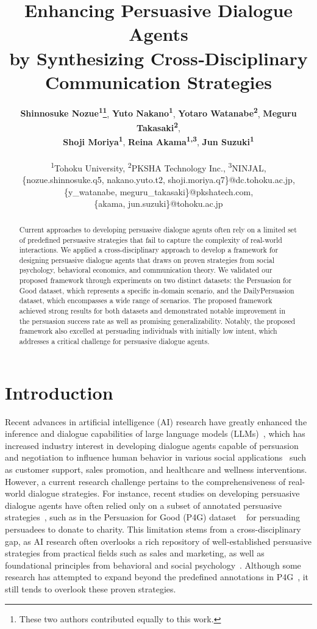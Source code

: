 \documentclass[11pt]{article}
\title{Enhancing Persuasive Dialogue Agents \\ by Synthesizing Cross‑Disciplinary Communication Strategies}
\author{ 
    \textbf{Shinnosuke Nozue\textsuperscript{1}\thanks{These two authors contributed equally to this work.}},
    \textbf{Yuto Nakano\textsuperscript{1}\footnotemark[1]},
    \textbf{Yotaro Watanabe\textsuperscript{2}},
    \textbf{Meguru Takasaki\textsuperscript{2}},
    \\
    \textbf{Shoji Moriya\textsuperscript{1}},
    \textbf{Reina Akama\textsuperscript{1,3}},
    \textbf{Jun Suzuki\textsuperscript{1}}
    \\
    \\
    \textsuperscript{1}Tohoku University,
    \textsuperscript{2}PKSHA Technology Inc.,
    \textsuperscript{3}NINJAL,
    \\
    \{nozue.shinnosuke.q5, nakano.yuto.t2, shoji.moriya.q7\}@dc.tohoku.ac.jp,\\
    \{y\_watanabe, meguru\_takasaki\}@pkshatech.com,\\
    \{akama, jun.suzuki\}@tohoku.ac.jp
}
\begin{document}
\maketitle

\begin{abstract}
Current approaches to developing persuasive dialogue agents often rely on a limited set of predefined persuasive strategies that fail to capture the complexity of real-world interactions. 
We applied a cross-disciplinary approach to develop a framework for designing persuasive dialogue agents that draws on proven strategies from social psychology, behavioral economics, and communication theory. 
We validated our proposed framework through experiments on two distinct datasets: the Persuasion for Good dataset, which represents a specific in-domain scenario, and the DailyPersuasion dataset, which encompasses a wide range of scenarios. 
The proposed framework achieved strong results for both datasets and demonstrated notable improvement in the persuasion success rate as well as promising generalizability. 
Notably, the proposed framework also excelled at persuading individuals with initially low intent, which addresses a critical challenge for persuasive dialogue agents.

\end{abstract}

\section{Introduction}
Recent advances in artificial intelligence (AI) research have greatly enhanced the inference and dialogue capabilities of large language models (LLMs)~\citep{brown2020language,openai2023gpt4}, which has increased industry interest in developing dialogue agents capable of persuasion and negotiation to influence human behavior in various social applications~\citep{deng2024towards,deng2025proactive, zhang-etal-2024-strength, zhan-etal-2024-lets, jin-etal-2024-persuading} such as customer support, sales promotion, and healthcare and wellness interventions. 
However, a current research challenge pertains to the comprehensiveness of real-world dialogue strategies.
For instance, recent studies on developing persuasive dialogue agents have often relied only on a subset of annotated persuasive strategies~\citep{song-wang-2024-like, cheng2024cooper, zhang-etal-2024-strength}, such as in the Persuasion for Good (P4G) dataset ~\citep{wang-etal-2019-persuasion} for persuading persuadees to donate to charity. 
This limitation stems from a cross-disciplinary gap, as AI research often overlooks a rich repository of well-established persuasive strategies from practical fields such as sales and marketing, as well as foundational principles from behavioral and social psychology~\citep[e.g.,][]{tversky1981framing,dhar1999effect}. 
Although some research has attempted to expand beyond the predefined annotations in P4G~\citep{jin-etal-2024-persuading}, it still tends to overlook these proven strategies.
\end{document}

